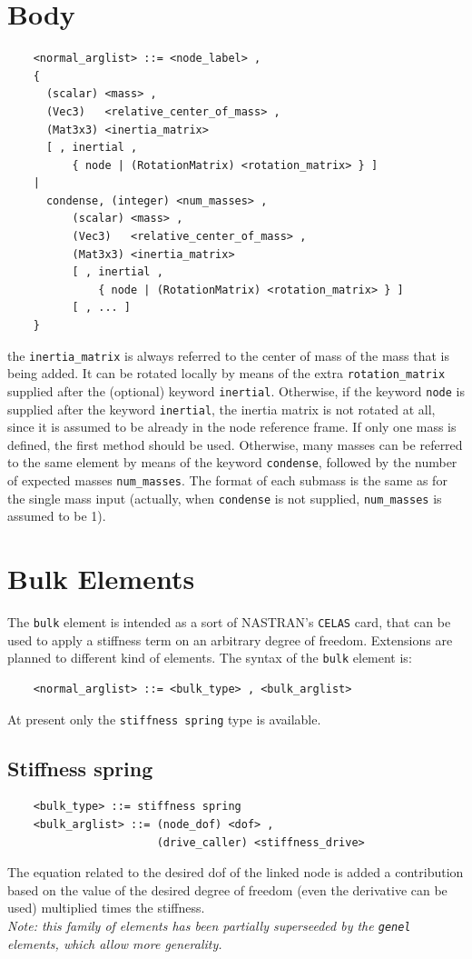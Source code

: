 \section{Body}
\begin{verbatim}
    <normal_arglist> ::= <node_label> , 
    { 
      (scalar) <mass> , 
      (Vec3)   <relative_center_of_mass> ,
      (Mat3x3) <inertia_matrix>
      [ , inertial , 
          { node | (RotationMatrix) <rotation_matrix> } ]
    |
      condense, (integer) <num_masses> ,
          (scalar) <mass> , 
          (Vec3)   <relative_center_of_mass> ,
          (Mat3x3) <inertia_matrix> 
          [ , inertial , 
              { node | (RotationMatrix) <rotation_matrix> } ]
          [ , ... ]
    }
\end{verbatim}
the \texttt{inertia\_matrix} is always referred to the center of mass of the
mass that is being added. It can be rotated locally by means of the extra
\texttt{rotation\_matrix} supplied after the (optional) keyword \texttt{inertial}.
Otherwise, if the keyword \texttt{node} is supplied after the keyword 
\texttt{inertial}, the inertia matrix is not rotated at all, since it is
assumed to be already in the node reference frame.
If only one mass is defined, the first method should be used. Otherwise,
many masses can be referred to the same element by means of the keyword
\texttt{condense}, followed by the number of expected masses \texttt{num\_masses}.
The format of each submass is the same as for the single mass input (actually, 
when \texttt{condense} is not supplied, \texttt{num\_masses} is assumed to be 1).




\section{Bulk Elements}
The \texttt{bulk} element is intended as a sort of NASTRAN's \texttt{CELAS} card,
that can be used to apply a stiffness term on an arbitrary degree of freedom.
Extensions are planned to different kind of elements.
The syntax of the \texttt{bulk} element is:
\begin{verbatim}
    <normal_arglist> ::= <bulk_type> , <bulk_arglist>
\end{verbatim}
At present only the \texttt{stiffness spring} type is available.

\subsection{Stiffness spring}
\begin{verbatim}
    <bulk_type> ::= stiffness spring
    <bulk_arglist> ::= (node_dof) <dof> ,
                       (drive_caller) <stiffness_drive>
\end{verbatim}
The equation related to the desired dof of the linked node is added a
contribution based on the value of the desired degree of freedom (even the
derivative can be used) multiplied times the stiffness. \\
{\em Note: this family of elements has been partially superseeded by the
\texttt{genel} elements, which allow more generality.}




